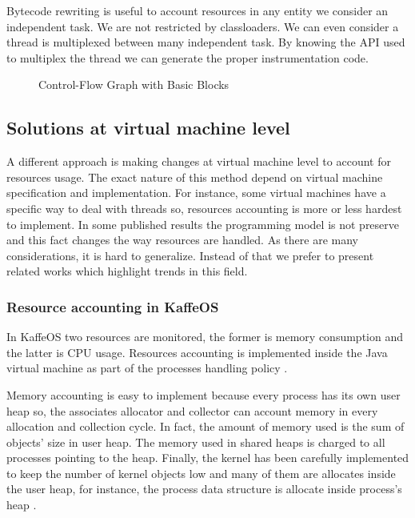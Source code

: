 Bytecode rewriting is useful to account resources in any entity we consider an independent task. We are not restricted by classloaders. We can even consider a thread is multiplexed between many independent task. By knowing the API used to multiplex the thread we can generate the proper instrumentation code.

\begin{figure}

\caption{Control-Flow Graph with Basic Blocks}\label{fig:fibFlow}
\centering
\end{figure}

\subsection{Solutions at virtual machine level}
A different approach is making changes at virtual machine level to account for resources usage. The exact nature of this method depend on virtual machine specification and implementation. For instance, some virtual machines have a specific way to deal with threads so, resources accounting is more or less hardest to implement. In some published results the programming model is not preserve and this fact changes the way resources are handled. As there are many considerations, it is hard to generalize. Instead of that we prefer to present related works which highlight trends in this field.

\subsubsection*{Resource accounting in KaffeOS}
In KaffeOS two resources are monitored, the former is memory consumption and the latter is CPU usage. Resources accounting is implemented inside the Java virtual machine as part of the processes handling policy \cite{back_processes_2000}.

Memory accounting is easy to implement because every process has its own user heap so, the associates allocator and collector can account memory in every allocation and collection cycle. In fact, the amount of memory used is the sum of objects' size in user heap. The memory used in shared heaps is charged to all processes pointing to the heap. Finally, the kernel has been carefully implemented to keep the number of kernel objects low and many of them are allocates inside the user heap, for instance, the process data structure is allocate inside process's heap \cite{back_processes_2000}.

